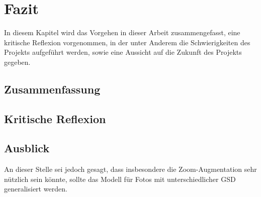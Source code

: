 \chapter{Fazit}

In diesem Kapitel wird das Vorgehen in dieser Arbeit zusammengefasst, eine kritische Reflexion vorgenommen, in der unter Anderem die Schwierigkeiten des Projekts aufgeführt werden, sowie eine Aussicht auf die Zukunft des Projekts gegeben. 

\section{Zusammenfassung}


\section{Kritische Reflexion}


\section{Ausblick}

An dieser Stelle sei jedoch gesagt, dass insbesondere die Zoom-Augmentation sehr nützlich sein könnte, 
sollte das Modell für Fotos mit unterschiedlicher \ac{GSD} generalisiert werden. 